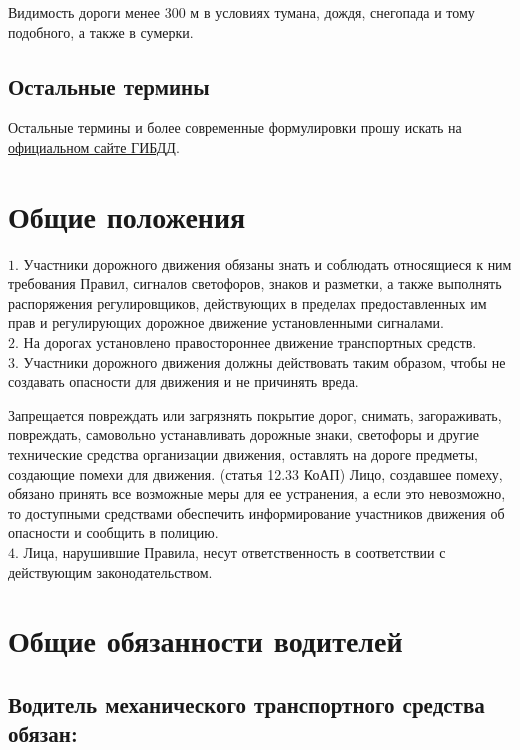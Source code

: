 \documentclass[russian,english,12pt,a4paper,reqno,dviphfm,oneside]{book}
\begin{document}
{Видимость дороги менее 300 м в условиях тумана, дождя, снегопада и тому подобного, а также в сумерки.

\section{Остальные термины}
Остальные термины и более современные формулировки прошу искать на \href{http://www.gibdd.ru//}{официальном сайте ГИБДД}.

\chapter{Общие положения}

$1.$ Участники дорожного движения обязаны знать и соблюдать относящиеся к ним требования Правил, сигналов светофоров, знаков и разметки, а также выполнять распоряжения регулировщиков, действующих в пределах предоставленных им прав и регулирующих дорожное движение установленными сигналами.\\

$2.$ На дорогах установлено правостороннее движение транспортных средств.\\

$3.$ Участники дорожного движения должны действовать таким образом, чтобы не создавать опасности для движения и не причинять вреда.

Запрещается повреждать или загрязнять покрытие дорог, снимать, загораживать, повреждать, самовольно устанавливать дорожные знаки, светофоры и другие технические средства организации движения, оставлять на дороге предметы, создающие помехи для движения. (статья 12.33 КоАП) Лицо, создавшее помеху, обязано принять все возможные меры для ее устранения, а если это невозможно, то доступными средствами обеспечить информирование участников движения об опасности и сообщить в полицию.\\

$4.$ Лица, нарушившие Правила, несут ответственность в соответствии с действующим законодательством.

\chapter{Общие обязанности водителей}

\section[Водитель механического транспортного средства обязан]{Водитель механического транспортного средства обязан:}
}
\end{document}
